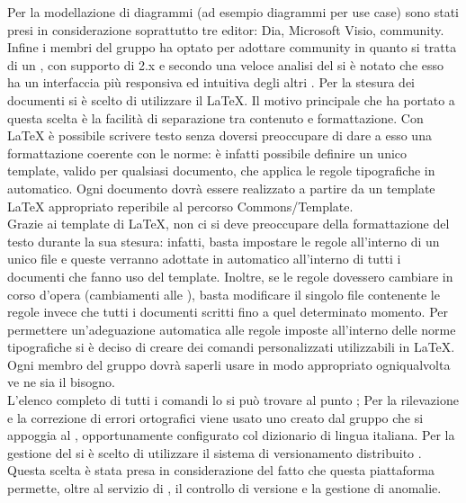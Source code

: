  \label{app:strumenti}
		Per la modellazione di diagrammi  (ad esempio diagrammi per use case) sono stati presi in considerazione soprattutto tre editor: Dia, Microsoft Visio,  community. Infine i membri del gruppo \groupname{} ha optato per adottare  community in quanto si tratta di un  , con supporto di  2.x e secondo una veloce analisi del  si è notato che esso ha un interfaccia più responsiva ed intuitiva degli altri .
		Per la stesura dei documenti si è scelto di utilizzare il  \LaTeX{}.  Il motivo principale che ha portato a questa scelta è la facilità di separazione tra contenuto e formattazione. Con \LaTeX{} è possibile scrivere testo senza doversi preoccupare di dare a esso una formattazione coerente con le norme: è infatti possibile definire un unico template, valido per qualsiasi documento, che applica le regole tipografiche in automatico.
			Ogni documento dovrà essere realizzato a partire da un template \LaTeX{} appropriato reperibile al percorso Commons/Template.\\
			Grazie ai template di \LaTeX{}, non ci si deve preoccupare della formattazione del testo durante la sua stesura: infatti, basta impostare le regole all’interno di un unico file e queste verranno adottate in automatico all’interno di tutti i documenti che fanno uso del template. Inoltre, se le regole dovessero cambiare in corso d’opera (cambiamenti alle ), basta modificare il singolo file contenente le regole invece che tutti i documenti scritti fino a quel determinato momento.
			Per permettere un’adeguazione automatica alle regole imposte all’interno delle norme tipografiche si è deciso di creare dei comandi personalizzati utilizzabili in \LaTeX{}. Ogni membro del gruppo dovrà saperli usare in modo appropriato ogniqualvolta ve ne sia il bisogno.\\
			L’elenco completo di tutti i comandi lo si può trovare al punto ;
		Per la rilevazione e la correzione di errori ortografici viene usato uno  creato dal gruppo \groupname{} che si appoggia al  , opportunamente configurato col dizionario di lingua italiana.
	\label{sec:SceltaRepository}
		Per la gestione del  si è scelto di utilizzare il sistema di versionamento distribuito . Questa scelta è stata presa in considerazione del fatto che questa piattaforma permette, oltre al servizio di , il controllo di versione e la gestione di anomalie. \\
